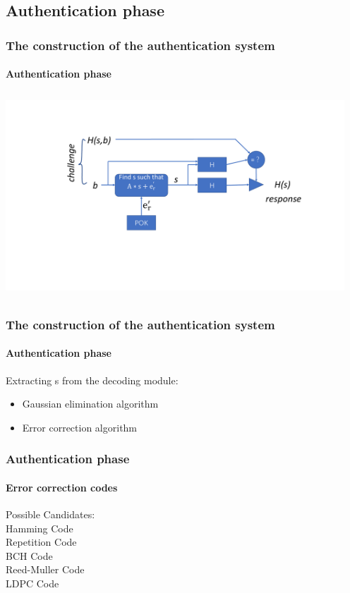 \documentclass{beamer}
\begin{document}
\subsection{Authentication phase}
\begin{frame}
	\frametitle{The construction of the authentication system}
	\framesubtitle{Authentication phase}
	\includegraphics[width=5in,height=3in]{Authentication-phase.pdf}
\end{frame}


\begin{frame}
	\frametitle{The construction of the authentication system}
	\framesubtitle{Authentication phase}
	{\Large	Extracting s from the decoding module:}\\
	\vspace{0.5cm}
	\begin{itemize}
		\item Gaussian elimination algorithm 
	\end{itemize}
	\begin{itemize}
	\item Error correction algorithm
	\end{itemize}
	
\end{frame}


\begin{frame}
	\frametitle{Authentication phase}
	\framesubtitle{Error correction codes}
	{\Large Possible Candidates:}\\
	\vspace{0.5cm}
	Hamming Code\\
	\vspace{0.3cm}
	Repetition Code\\
	\vspace{0.3cm}
	BCH Code\\
	\vspace{0.3cm}
	Reed-Muller Code\\
	\vspace{0.3cm}
	LDPC Code\\	
\end{frame}
\end{document}
